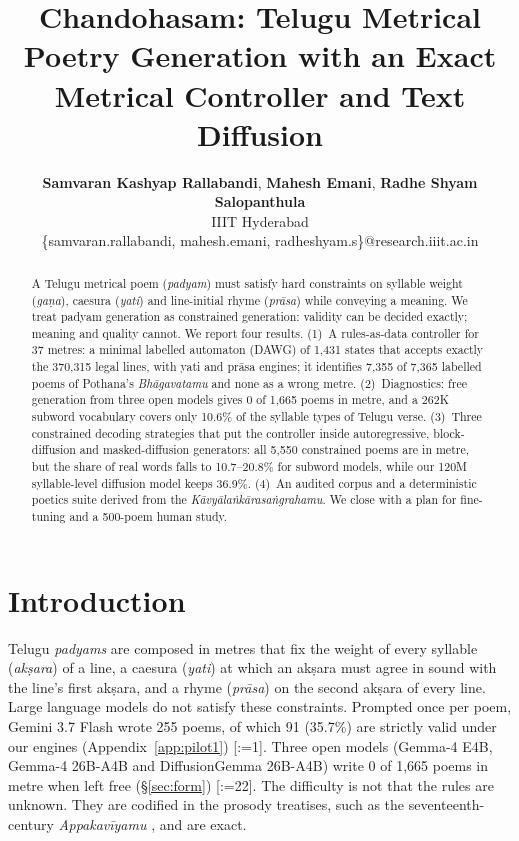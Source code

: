 \documentclass[11pt]{article}
\title{Chandohasam: Telugu Metrical Poetry Generation with an Exact Metrical Controller and Text Diffusion}
\author{
 \textbf{Samvaran Kashyap Rallabandi},
 \textbf{Mahesh Emani},
 \textbf{Radhe Shyam Salopanthula}
\\
 IIIT Hyderabad
\\
 \small{\{samvaran.rallabandi, mahesh.emani, radheshyam.s\}@research.iiit.ac.in}
}
\makeatletter
\DeclareRobustCommand{\exref}[1]{{\scriptsize[\def\ex@sep{}\@for\ex@i:=#1\do{\ex@sep
  \expandafter\ex@item\expandafter{\ex@i}\def\ex@sep{, }}]}}
\newcommand{\ex@item}[1]{\in@{-}{#1}\ifin@\ex@range#1\@nil\else\ex@link{#1}\fi}
\def\ex@range#1-#2\@nil{\ex@link{#1}--\ex@link{#2}}
\newcommand{\ex@link}[1]{\hyperref[exp:E#1]{E#1}}
\makeatother
\begin{document}
\maketitle

\begin{abstract}
A Telugu metrical poem (\textit{padyam}) must satisfy hard constraints on syllable weight (\textit{gaṇa}),
caesura (\textit{yati}) and line-initial rhyme (\textit{prāsa}) while conveying a meaning. We treat padyam
generation as constrained generation: validity can be decided exactly; meaning and quality cannot. We
report four results. (1)~A rules-as-data controller for 37 metres: a minimal labelled automaton (DAWG) of
1,431 states that accepts exactly the 370,315 legal lines, with yati and prāsa engines; it identifies 7,355
of 7,365 labelled poems of Pothana's \textit{Bhāgavatamu} and none as a wrong metre. (2)~Diagnostics: free
generation from three open models gives 0 of 1,665 poems in metre, and a 262K subword vocabulary covers only
10.6\% of the syllable types of Telugu verse. (3)~Three constrained decoding strategies that put the controller inside
autoregressive, block-diffusion and masked-diffusion generators: all 5,550 constrained poems are in metre, but the share of real words falls to
10.7--20.8\% for subword models, while our 120M syllable-level diffusion model keeps 36.9\%. (4)~An audited
corpus and a deterministic poetics suite derived from the \textit{Kāvyālaṅkārasaṅgrahamu}. We close with a
plan for fine-tuning and a 500-poem human study.
\end{abstract}

\section{Introduction}\label{sec:intro}

Telugu \textit{padyams} are composed in metres that fix the weight of every syllable (\textit{akṣara}) of
a line, a caesura (\textit{yati}) at which an akṣara must agree in sound with the line's first akṣara, and
a rhyme (\textit{prāsa}) on the second akṣara of every line. Large language models do not satisfy these
constraints. Prompted once per poem, Gemini 3.7 Flash wrote 255
poems, of which 91 (35.7\%) are strictly valid under our engines (Appendix~\ref{app:pilot1}) \exref{1}. Three
open models (Gemma-4 E4B, Gemma-4 26B-A4B and DiffusionGemma 26B-A4B) write 0 of 1,665 poems in metre when
left free (\S\ref{sec:form}) \exref{22}. The difficulty is not that the rules are unknown. They are codified in the
prosody treatises, such as the seventeenth-century \textit{Appakavīyamu} \citep{appakavi1656}, and are
exact.
\end{document}
